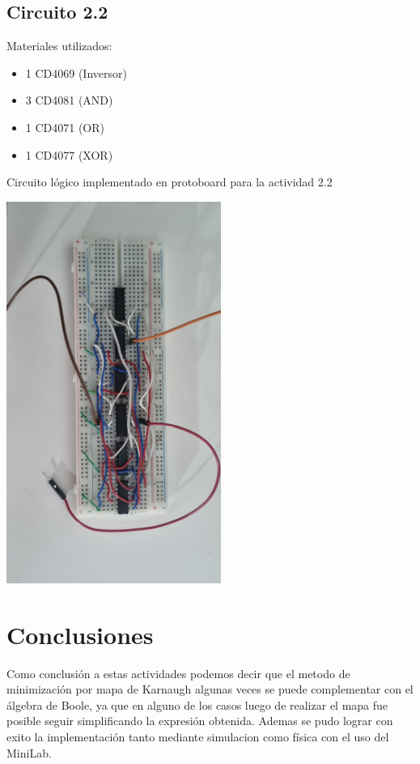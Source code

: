 \saltoPag

\subsection{Circuito 2.2}

    Materiales utilizados:
    \begin{itemize}
        \item 1 CD4069 (Inversor)
        \item 3 CD4081 (AND)
        \item 1 CD4071 (OR)
        \item 1 CD4077 (XOR)
    \end{itemize}
Circuito lógico implementado en protoboard para la actividad 2.2
    \begin{center}
    \includegraphics[width=7cm]{imagenes/Circuito2.jpg}
    \end{center}

    \section{Conclusiones}

    Como conclusión a estas actividades podemos decir que el metodo de minimización por mapa de Karnaugh algunas veces se puede complementar con el álgebra de Boole, ya que en alguno de los casos luego de realizar el mapa fue posible seguir simplificando la expresión obtenida. Ademas se pudo lograr con exito la implementación tanto mediante simulacion como física con el uso del MiniLab.
    
